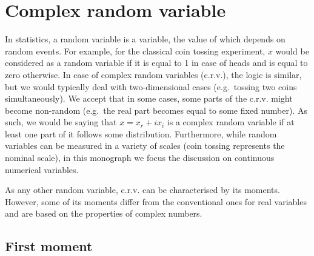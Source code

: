 \documentclass[
]{book}
\begin{document}
\hypertarget{complexRandomVariable}{%
\section{Complex random variable}\label{complexRandomVariable}}

In statistics, a random variable is a variable, the value of which depends on random events. For example, for the classical coin tossing experiment, \(x\) would be considered as a random variable if it is equal to 1 in case of heads and is equal to zero otherwise. In case of complex random variables (c.r.v.), the logic is similar, but we would typically deal with two-dimensional cases (e.g.~tossing two coins simultaneously). We accept that in some cases, some parts of the c.r.v. might become non-random (e.g.~the real part becomes equal to some fixed number). As such, we would be saying that \(x=x_r+ix_i\) is a complex random variable if at least one part of it follows some distribution. Furthermore, while random variables can be measured in a variety of scales (coin tossing represents the nominal scale), in this monograph we focus the discussion on continuous numerical variables.

As any other random variable, c.r.v. can be characterised by its moments. However, some of its moments differ from the conventional ones for real variables and are based on the properties of complex numbers.

\hypertarget{first-moment}{%
\subsection{First moment}\label{first-moment}}
\end{document}
